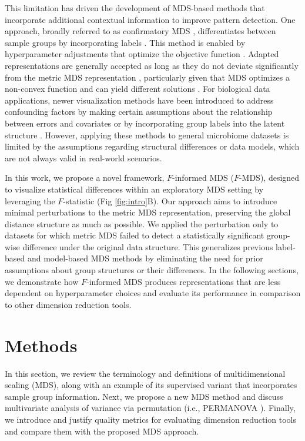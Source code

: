 \documentclass[10pt,letterpaper]{article}
\newcommand{\1}{{\rm 1}\kern-0.24em{\rm I}}
\begin{document}
This limitation has driven the development of MDS-based methods that incorporate additional contextual information to improve pattern detection. One approach, broadly referred to as confirmatory MDS \cite{borg97b, ding18}, differentiates between sample groups by incorporating labels \cite{cox93, yang18}. This method is enabled by hyperparameter adjustments that optimize the objective function \cite{yang18, Wang22, witten11}.
Adapted representations are generally accepted as long as they do not deviate significantly from the metric MDS representation \cite{borg97a}, particularly given that MDS optimizes a non-convex function and can yield different solutions \cite{Demaine21, zheng19}. 
For biological data applications, newer visualization methods have been introduced to address confounding factors by making certain assumptions about the relationship between errors and covariates \cite{Shi20} or by incorporating group labels into the latent structure \cite{Wang22, Lin16}. 
However, applying these methods to general microbiome datasets is limited by the assumptions regarding structural differences or data models, which are not always valid in real-world scenarios.

In this work, we propose a novel framework, $F$-informed MDS ($F$-MDS), designed to visualize statistical differences within an exploratory MDS setting by leveraging the $F$-statistic (Fig \ref{fig:intro}B). 
Our approach aims to introduce minimal perturbations to the metric MDS representation, preserving the global distance structure as much as possible. 
We applied the perturbation only to datasets for which metric MDS failed to detect a statistically significant group-wise difference under the original data structure.
This generalizes previous label-based and model-based MDS methods by eliminating the need for prior assumptions about group structures or their differences. 
In the following sections, we demonstrate how $F$-informed MDS produces representations that are less dependent on hyperparameter choices and evaluate its performance in comparison to other dimension reduction tools.



\section*{Methods} \label{sec:methods}
In this section, we review the terminology and definitions of multidimensional scaling (MDS), along with an example of its supervised variant that incorporates sample group information.
Next, we propose a new MDS method and discuss multivariate analysis of variance via permutation (i.e., PERMANOVA \cite{anderson01}).
Finally, we introduce and justify quality metrics for evaluating dimension reduction tools and compare them with the proposed MDS approach.
\end{document}
